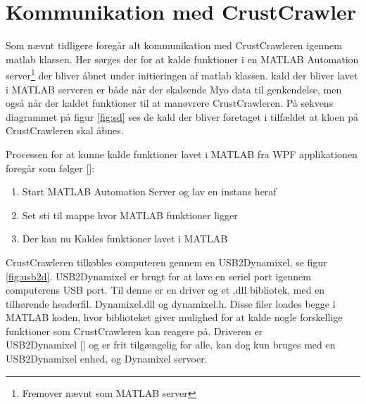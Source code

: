 


\section{Kommunikation med CrustCrawler}
\label{sec:ktc}
Som nævnt tidligere foregår alt kommunikation med CrustCrawleren igennem matlab klassen. Her sørges der for at kalde funktioner i en MATLAB Automation server\footnote{Fremover nævnt som MATLAB server} der bliver åbnet under initieringen af matlab klassen. kald der bliver lavet i MATLAB serveren er både når der skalsende Myo data til genkendelse, men også når der kaldet funktioner til at manøvrere CrustCrawleren. På sekvens diagrammet på figur \ref{fig:sd} ses de kald der bliver foretaget i tilfældet at kloen på CrustCrawleren skal åbnes.


Processen for at kunne kalde funktioner lavet i MATLAB fra WPF applikationen foregår som følger [\cite{MatlabC}]:
\begin{enumerate}
	\item Start MATLAB Automation Server og lav en instans heraf
	\item Set sti til mappe hvor MATLAB funktioner ligger
	\item Der kan nu Kaldes funktioner lavet i MATLAB
\end{enumerate}


CrustCrawleren tilkobles computeren gennem en USB2Dynamixel, se figur \ref{fig:usb2d}. USB2Dynamixel er brugt for at lave en seriel port igennem computerens USB port. Til denne er en driver og et .dll bibliotek, med en tilhørende headerfil. Dynamixel.dll og dynamixel.h. Disse filer loades begge i MATLAB koden, hvor biblioteket giver mulighed for at kalde nogle forskellige funktioner som CrustCrawleren kan reagere på. Driveren er\\ USB2Dynamixel [\cite{usb2dynamixel}]  og er frit tilgængelig for alle, kan dog kun bruges med en USB2Dynamixel enhed, og Dynamixel servoer.

